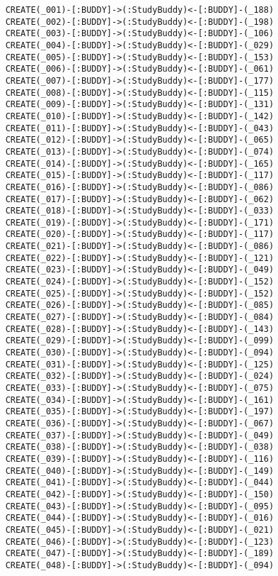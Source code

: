 \begin{lstlisting}
	CREATE(_001)-[:BUDDY]->(:StudyBuddy)<-[:BUDDY]-(_188)
	CREATE(_002)-[:BUDDY]->(:StudyBuddy)<-[:BUDDY]-(_198)
	CREATE(_003)-[:BUDDY]->(:StudyBuddy)<-[:BUDDY]-(_106)
	CREATE(_004)-[:BUDDY]->(:StudyBuddy)<-[:BUDDY]-(_029)
	CREATE(_005)-[:BUDDY]->(:StudyBuddy)<-[:BUDDY]-(_153)
	CREATE(_006)-[:BUDDY]->(:StudyBuddy)<-[:BUDDY]-(_061)
	CREATE(_007)-[:BUDDY]->(:StudyBuddy)<-[:BUDDY]-(_177)
	CREATE(_008)-[:BUDDY]->(:StudyBuddy)<-[:BUDDY]-(_115)
	CREATE(_009)-[:BUDDY]->(:StudyBuddy)<-[:BUDDY]-(_131)
	CREATE(_010)-[:BUDDY]->(:StudyBuddy)<-[:BUDDY]-(_142)
	CREATE(_011)-[:BUDDY]->(:StudyBuddy)<-[:BUDDY]-(_043)
	CREATE(_012)-[:BUDDY]->(:StudyBuddy)<-[:BUDDY]-(_065)
	CREATE(_013)-[:BUDDY]->(:StudyBuddy)<-[:BUDDY]-(_074)
	CREATE(_014)-[:BUDDY]->(:StudyBuddy)<-[:BUDDY]-(_165)
	CREATE(_015)-[:BUDDY]->(:StudyBuddy)<-[:BUDDY]-(_117)
	CREATE(_016)-[:BUDDY]->(:StudyBuddy)<-[:BUDDY]-(_086)
	CREATE(_017)-[:BUDDY]->(:StudyBuddy)<-[:BUDDY]-(_062)
	CREATE(_018)-[:BUDDY]->(:StudyBuddy)<-[:BUDDY]-(_033)
	CREATE(_019)-[:BUDDY]->(:StudyBuddy)<-[:BUDDY]-(_171)
	CREATE(_020)-[:BUDDY]->(:StudyBuddy)<-[:BUDDY]-(_117)
	CREATE(_021)-[:BUDDY]->(:StudyBuddy)<-[:BUDDY]-(_086)
	CREATE(_022)-[:BUDDY]->(:StudyBuddy)<-[:BUDDY]-(_121)
	CREATE(_023)-[:BUDDY]->(:StudyBuddy)<-[:BUDDY]-(_049)
	CREATE(_024)-[:BUDDY]->(:StudyBuddy)<-[:BUDDY]-(_152)
	CREATE(_025)-[:BUDDY]->(:StudyBuddy)<-[:BUDDY]-(_152)
	CREATE(_026)-[:BUDDY]->(:StudyBuddy)<-[:BUDDY]-(_085)
	CREATE(_027)-[:BUDDY]->(:StudyBuddy)<-[:BUDDY]-(_084)
	CREATE(_028)-[:BUDDY]->(:StudyBuddy)<-[:BUDDY]-(_143)
	CREATE(_029)-[:BUDDY]->(:StudyBuddy)<-[:BUDDY]-(_099)
	CREATE(_030)-[:BUDDY]->(:StudyBuddy)<-[:BUDDY]-(_094)
	CREATE(_031)-[:BUDDY]->(:StudyBuddy)<-[:BUDDY]-(_125)
	CREATE(_032)-[:BUDDY]->(:StudyBuddy)<-[:BUDDY]-(_024)
	CREATE(_033)-[:BUDDY]->(:StudyBuddy)<-[:BUDDY]-(_075)
	CREATE(_034)-[:BUDDY]->(:StudyBuddy)<-[:BUDDY]-(_161)
	CREATE(_035)-[:BUDDY]->(:StudyBuddy)<-[:BUDDY]-(_197)
	CREATE(_036)-[:BUDDY]->(:StudyBuddy)<-[:BUDDY]-(_067)
	CREATE(_037)-[:BUDDY]->(:StudyBuddy)<-[:BUDDY]-(_049)
	CREATE(_038)-[:BUDDY]->(:StudyBuddy)<-[:BUDDY]-(_038)
	CREATE(_039)-[:BUDDY]->(:StudyBuddy)<-[:BUDDY]-(_116)
	CREATE(_040)-[:BUDDY]->(:StudyBuddy)<-[:BUDDY]-(_149)
	CREATE(_041)-[:BUDDY]->(:StudyBuddy)<-[:BUDDY]-(_044)
	CREATE(_042)-[:BUDDY]->(:StudyBuddy)<-[:BUDDY]-(_150)
	CREATE(_043)-[:BUDDY]->(:StudyBuddy)<-[:BUDDY]-(_095)
	CREATE(_044)-[:BUDDY]->(:StudyBuddy)<-[:BUDDY]-(_016)
	CREATE(_045)-[:BUDDY]->(:StudyBuddy)<-[:BUDDY]-(_021)
	CREATE(_046)-[:BUDDY]->(:StudyBuddy)<-[:BUDDY]-(_123)
	CREATE(_047)-[:BUDDY]->(:StudyBuddy)<-[:BUDDY]-(_189)
	CREATE(_048)-[:BUDDY]->(:StudyBuddy)<-[:BUDDY]-(_094)

\end{lstlisting}
